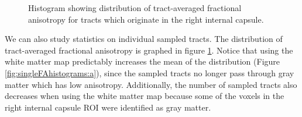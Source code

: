 \begin{figure}
	\caption{Histogram showing distribution of tract-averaged fractional anisotropy for tracts which originate in the right internal capsule.}
  \label{fig:singleFAhistograms}
\end{figure}

We can also study statistics on individual sampled tracts.  The distribution of tract-averaged fractional anisotropy is graphed in figure \ref{fig:singleFAhistograms}.  Notice that using the white matter map predictably increases the mean of the distribution (Figure \ref{fig:singleFAhistograms:a}), since the sampled tracts no longer pass through gray matter which has low anisotropy.  Additionally, the number of sampled tracts also decreases when using the white matter map because some of the voxels in the right internal capsule ROI were identified as gray matter.

